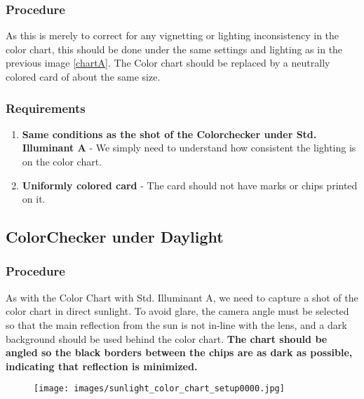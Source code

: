 \documentclass[twoside]{article}
\begin{document}
\subsubsection{Procedure}
As this is merely to correct for any vignetting or lighting inconsistency in the color chart, this should be done under the same settings and lighting as in the previous image \ref{chartA}. The Color chart should be replaced by a neutrally colored card of about the same size.

\subsubsection{Requirements}
\begin{enumerate}
    \item \textbf{Same conditions as the shot of the Colorchecker under Std. Illuminant A} - We simply need to understand how consistent the lighting is on the color chart.
    \item \textbf{Uniformly colored card} - The card should not have marks or chips printed on it.
\end{enumerate}


\newpage
\subsection{ColorChecker under Daylight}

\subsubsection{Procedure}
As with the Color Chart with Std. Illuminant A, we need to capture a shot of the color chart in direct sunlight. To avoid glare, the camera angle must be selected so that the main reflection from the sun is not in-line with the lens, and a dark background should be used behind the color chart. \textbf{The chart should be angled so the black borders between the chips are as dark as possible, indicating that reflection is minimized.}


\begin{figure}[ht]
    \centering
    \texttt{[image: images/sunlight\_color\_chart\_setup0000.jpg]}
\end{figure}
\end{document}
